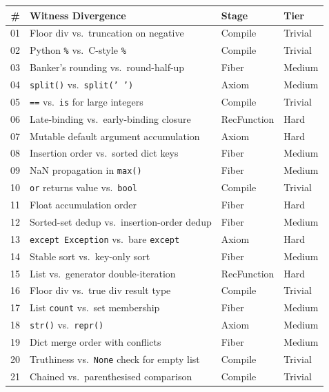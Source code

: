 \documentclass[11pt,a4paper]{report}
\theoremstyle{definition}
\theoremstyle{plain}
\begin{document}
\begin{center}
\small
\begin{tabular}{r p{5cm} l l}
  \textbf{\#} & \textbf{Witness Divergence} & \textbf{Stage} & \textbf{Tier} \\
  \hline
  01 & Floor div vs.\ truncation on negative &
       Compile & Trivial \\
  02 & Python \texttt{\%} vs.\ C-style \texttt{\%} &
       Compile & Trivial \\
  03 & Banker's rounding vs.\ round-half-up &
       Fiber & Medium \\
  04 & \texttt{split()} vs.\ \texttt{split(' ')} &
       Axiom & Medium \\
  05 & \texttt{==} vs.\ \texttt{is} for large integers &
       Compile & Trivial \\
  06 & Late-binding vs.\ early-binding closure &
       RecFunction & Hard \\
  07 & Mutable default argument accumulation &
       Axiom & Hard \\
  08 & Insertion order vs.\ sorted dict keys &
       Fiber & Medium \\
  09 & NaN propagation in \texttt{max()} &
       Fiber & Medium \\
  10 & \texttt{or} returns value vs.\ \texttt{bool} &
       Compile & Trivial \\
  11 & Float accumulation order &
       Fiber & Hard \\
  12 & Sorted-set dedup vs.\ insertion-order dedup &
       Fiber & Medium \\
  13 & \texttt{except Exception} vs.\ bare \texttt{except} &
       Axiom & Hard \\
  14 & Stable sort vs.\ key-only sort &
       Fiber & Medium \\
  15 & List vs.\ generator double-iteration &
       RecFunction & Hard \\
  16 & Floor div vs.\ true div result type &
       Compile & Trivial \\
  17 & List \texttt{count} vs.\ set membership &
       Fiber & Medium \\
  18 & \texttt{str()} vs.\ \texttt{repr()} &
       Axiom & Medium \\
  19 & Dict merge order with conflicts &
       Fiber & Medium \\
  20 & Truthiness vs.\ \texttt{None} check for empty list &
       Compile & Trivial \\
  21 & Chained vs.\ parenthesised comparison &
       Compile & Trivial \\

\end{tabular}
\end{center}
\end{document}
